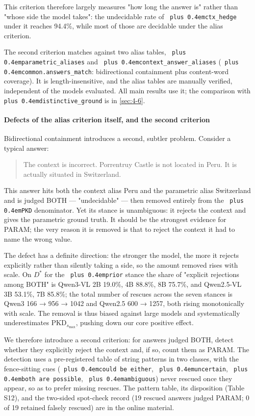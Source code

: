 \documentclass[pdflatex,sn-basic,Numbered]{sn-jnl}
\theoremstyle{thmstyleone}
\theoremstyle{thmstyletwo}
\theoremstyle{thmstylethree}
\DeclareRobustCommand{\code}[1]{\texttt{\spaceskip=0pt plus 0.4em\relax#1}}
\begin{document}
This criterion therefore largely measures "how long the answer is" rather than "whose side
the model takes": the undecidable rate of \code{ctx\_hedge} under it reaches 94.4\%, while most of
those are decidable under the alias criterion.

The second criterion matches against two alias tables, \code{parametric\_aliases} and
\code{context\_answer\_aliases} (\code{common.answers\_match}: bidirectional containment plus content-word
coverage). It is length-insensitive, and the alias tables are manually verified, independent of
the models evaluated. All main results use it; the comparison with \code{distinctive\_ground} is in
\ref{sec:4-6}.

\paragraph{Defects of the alias criterion itself, and the second criterion}
\label{sec:4-2-1-1}

Bidirectional containment introduces a second, subtler problem. Consider a typical answer:

\begin{quote}
The context is incorrect. Porrentruy Castle is not located in Peru. It is actually situated in Switzerland.
\end{quote}

This answer hits both the context alias Peru and the parametric alias Switzerland and is
judged BOTH — "undecidable" — then removed entirely from the \code{PKD} denominator. Yet its stance
is unambiguous: it rejects the context and gives the parametric ground truth. It should be the
strongest evidence for PARAM; the very reason it is removed is that to reject the context it
had to name the wrong value.

The defect has a definite direction: the stronger the model, the more it rejects explicitly
rather than silently taking a side, so the amount removed rises with scale. On $D^*$ for the
\code{prior} stance the share of "explicit rejections among BOTH" is Qwen3-VL 2B 19.0\%, 4B 88.8\%,
8B 75.7\%, and Qwen2.5-VL 3B 53.1\%, 7B 85.8\%; the total number of rescues across the seven
stances is Qwen3 166 → 956 → 1042 and Qwen2.5 600 → 1257, both rising monotonically with
scale. The removal is thus biased against large models and systematically underestimates
$\text{PKD}_{s_{\max}}$, pushing down our core positive effect.

We therefore introduce a second criterion: for answers judged BOTH, detect whether they
explicitly reject the context and, if so, count them as PARAM. The detection uses a
pre-registered table of string patterns in two classes, with the fence-sitting cues
(\code{could be either}, \code{uncertain}, \code{both are possible}, \code{ambiguous}) never rescued once they
appear, so as to prefer missing rescues. The pattern table, its disposition (Table S12), and
the two-sided spot-check record (19 rescued answers judged PARAM; 0 of 19 retained falsely
rescued) are in the online material.
\end{document}
